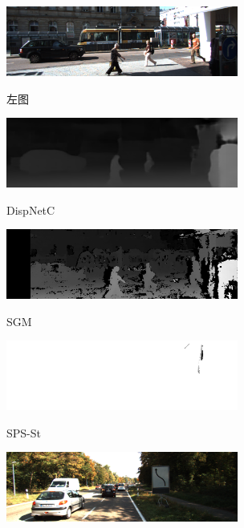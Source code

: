 \begin{figure}[!htb]
\begin{minipage}{0.48\linewidth}
		\centerline{\includegraphics[width=3in]{figures/cmp_kitti/l_032}}
		\vspace{-10pt}
		\centerline{左图}
	\end{minipage}
	\hfill
	\begin{minipage}{0.48\linewidth}
		\centerline{\includegraphics[width=3in]{figures/cmp_kitti/pred_032}}
		\vspace{-10pt}
		\centerline{DispNetC}
	\end{minipage}
	\vfill
	\begin{minipage}{0.48\linewidth}
		\centerline{\includegraphics[width=3in]{figures/cmp_kitti/sgm_032}}
		\vspace{-10pt}
		\centerline{SGM}
	\end{minipage}
	\hfill
	\begin{minipage}{0.48\linewidth}
		\centerline{\includegraphics[width=3in]{figures/cmp_kitti/sps_032}}
		\vspace{-10pt}
		\centerline{SPS-St}
	\end{minipage}
\begin{minipage}{0.48\linewidth}
	\centerline{\includegraphics[width=3in]{figures/cmp_kitti/l_097}}

\end{minipage}
\end{figure}
